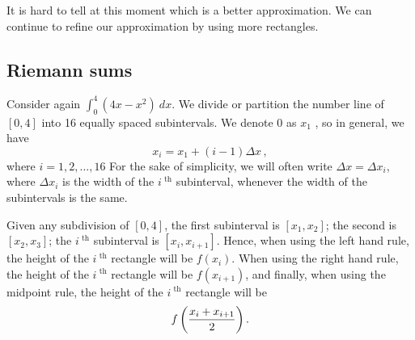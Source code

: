 





It is hard to tell at this moment which is a better approximation. We can continue to refine our approximation by using more rectangles.

\subsection{Riemann sums}
Consider again $\int_0^4(4x-x^2)\ dx$. 
We divide or partition the number line of $[0,4]$ into 16 equally spaced subintervals. We denote $0$ as $x_1$
, so in general, we have
$$x_i = x_1 + (i-1)\Delta x\,,$$
where $i=1,2,\ldots,16$ For the sake of simplicity, we will often write $\Delta x=\Delta x_i$, where $\Delta x_i$ is the width of the $i^\text{ th}$ subinterval, whenever the width of the subintervals is the same. 

Given any subdivision of $[0,4]$, the first subinterval is $[x_1,x_2]$; the second is $[x_2,x_3]$; the $i^\text{ th}$ subinterval is $[x_i,x_{i+1}]$. Hence, when using the left hand rule, the height of the $i^\text{ th}$ rectangle will be $f(x_i)$. When using the right hand rule, the height of the $i^\text{ th}$ rectangle will be $f(x_{i+1})$, and finally, when using the midpoint rule, the height of the $i^\text{ th}$ rectangle will be 
$$\displaystyle f\left(\frac{x_i+x_{i+1}}2\right).$$ 


